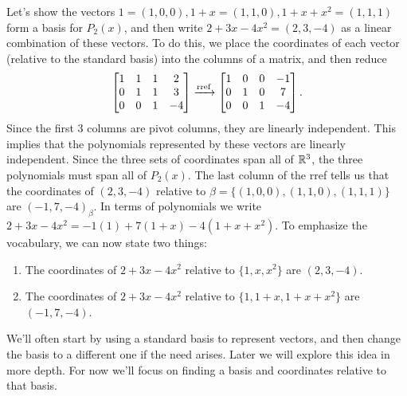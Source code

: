 \begin{example}
Let's show the vectors $1 = (1,0,0),1+x=(1,1,0), 1+x+x^2=(1,1,1)$ form a basis for $P_2(x)$, and then write $2+3x-4x^2 = (2,3,-4)$ as a linear combination of these vectors. 
To do this, we place the coordinates of each vector (relative to the standard basis) into the columns of a matrix, and then reduce 
$$\begin{bmatrix}
 1 & 1 & 1 & 2 \\
 0 & 1 & 1 & 3 \\
 0 & 0 & 1 & -4
\end{bmatrix}
\xrightarrow{\operatorname{rref}}
\begin{bmatrix}
 1 & 0 & 0 & -1 \\
 0 & 1 & 0 & 7 \\
 0 & 0 & 1 & -4
\end{bmatrix}.$$ 
Since the first 3 columns are pivot columns, they are linearly independent. 
This implies that the polynomials represented by these vectors are linearly independent. Since the three sets of coordinates span all of $\mathbb{R}^3$, the three polynomials must span all of $P_2(x)$.
The last column of the rref tells us that the coordinates of $(2,3,-4)$ relative to $\beta=\{(1,0,0),(1,1,0),(1,1,1)\}$ are $(-1,7,-4)_\beta$. In terms of polynomials we write $2+3x-4x^2 = -1(1)+7(1+x)-4(1+x+x^2)$. To emphasize the vocabulary, we can now state two things:
\begin{enumerate}
	\item The coordinates of $2+3x-4x^2$ relative to $\{1,x,x^2\}$ are $(2,3,-4)$.
	\item The coordinates of $2+3x-4x^2$ relative to $\{1,1+x,1+x+x^2\}$ are $(-1,7,-4)$.
\end{enumerate}
\end{example}

We'll often start by using a standard basis to represent vectors, and then change the basis to a different one if the need arises.  Later we will explore this idea in more depth.  For now we'll focus on finding a basis and coordinates relative to that basis.

